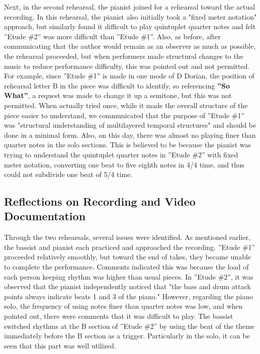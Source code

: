 Next, in the second rehearsal, the pianist joined for a rehearsal toward the actual recording. In this rehearsal, the pianist also initially took a "fixed meter notation" approach, but similarly found it difficult to play quintuplet quarter notes and felt ''Etude \#2'' was more difficult than ''Etude \#1''. Also, as before, after communicating that the author would remain as an observer as much as possible, the rehearsal proceeded, but when performers made structural changes to the music to reduce performance difficulty, this was pointed out and not permitted. For example, since ''Etude \#1'' is made in one mode of D Dorian, the position of rehearsal letter B in the piece was difficult to identify, so referencing {\bf ''So What''}\cite{miles:01}, a request was made to change it up a semitone, but this was not permitted. When actually tried once, while it made the overall structure of the piece easier to understand, we communicated that the purpose of ''Etude \#1'' was "structural understanding of multilayered temporal structures" and should be done in a minimal form. Also, on this day, there was almost no playing finer than quarter notes in the solo sections. This is believed to be because the pianist was trying to understand the quintuplet quarter notes in ''Etude \#2'' with fixed meter notation, converting one beat to five eighth notes in 4/4 time, and thus could not subdivide one beat of 5/4 time.

\subsection{Reflections on Recording and Video Documentation}

Through the two rehearsals, several issues were identified. As mentioned earlier, the bassist and pianist each practiced and approached the recording. ''Etude \#1'' proceeded relatively smoothly, but toward the end of takes, they became unable to complete the performance. Comments indicated this was because the load of each person keeping rhythm was higher than usual pieces. In ''Etude \#2'', it was observed that the pianist independently noticed that "the bass and drum attack points always indicate beats 1 and 3 of the piano." However, regarding the piano solo, the frequency of using notes finer than quarter notes was low, and when pointed out, there were comments that it was difficult to play. The bassist switched rhythms at the B section of ''Etude \#2'' by using the beat of the theme immediately before the B section as a trigger. Particularly in the solo, it can be seen that this part was well utilized.

